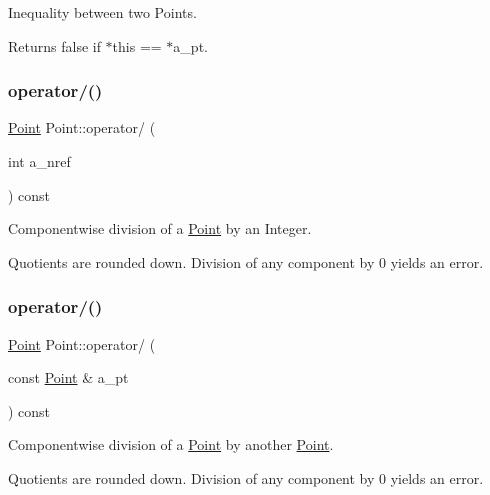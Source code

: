 Inequality between two Points. 

Returns false if $\ast$this == $\ast$a\+\_\+pt. \mbox{\label{class_point_a4f8c24c02a61c5727fa4e049638feba7}} 
\subsubsection{\texorpdfstring{operator/()}{operator/()}\hspace{0.1cm}{\footnotesize\ttfamily [1/2]}}
{\footnotesize\ttfamily \hyperlink{class_point}{Point} Point\+::operator/ (\begin{DoxyParamCaption}\item[{int}]{a\+\_\+nref }\end{DoxyParamCaption}) const\hspace{0.3cm}{\ttfamily [inline]}}



Componentwise division of a \hyperlink{class_point}{Point} by an Integer. 

Quotients are rounded down. Division of any component by 0 yields an error. \mbox{\label{class_point_a15d362c09b31d632a0f3cd5e7a96eef7}} 
\subsubsection{\texorpdfstring{operator/()}{operator/()}\hspace{0.1cm}{\footnotesize\ttfamily [2/2]}}
{\footnotesize\ttfamily \hyperlink{class_point}{Point} Point\+::operator/ (\begin{DoxyParamCaption}\item[{const \hyperlink{class_point}{Point} \&}]{a\+\_\+pt }\end{DoxyParamCaption}) const\hspace{0.3cm}{\ttfamily [inline]}}



Componentwise division of a \hyperlink{class_point}{Point} by another \hyperlink{class_point}{Point}. 

Quotients are rounded down. Division of any component by 0 yields an error. \mbox{\label{class_point_a61672dab6c26441eac5aca9928cdfc1f}} 

